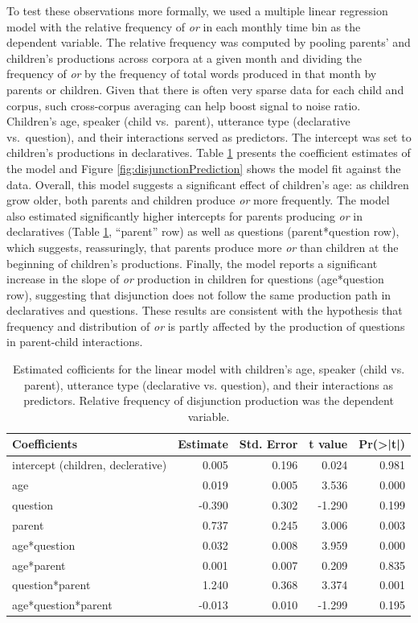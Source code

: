 \documentclass[
  english,
  ,man,floatsintext]{apa6}
\begin{document}
To test these observations more formally, we used a multiple linear regression model with the relative frequency of \emph{or} in each monthly time bin as the dependent variable. The relative frequency was computed by pooling parents' and children's productions across corpora at a given month and dividing the frequency of \emph{or} by the frequency of total words produced in that month by parents or children. Given that there is often very sparse data for each child and corpus, such cross-corpus averaging can help boost signal to noise ratio. Children's age, speaker (child vs.~parent), utterance type (declarative vs.~question), and their interactions served as predictors. The intercept was set to children's productions in declaratives. Table \ref{tab:study1coeftable} presents the coefficient estimates of the model and Figure \ref{fig:disjunctionPrediction} shows the model fit against the data. Overall, this model suggests a significant effect of children's age: as children grow older, both parents and children produce \emph{or} more frequently. The model also estimated significantly higher intercepts for parents producing \emph{or} in declaratives (Table \ref{tab:study1coeftable}, ``parent'' row) as well as questions (parent*question row), which suggests, reassuringly, that parents produce more \emph{or} than children at the beginning of children's productions. Finally, the model reports a significant increase in the slope of \emph{or} production in children for questions (age*question row), suggesting that disjunction does not follow the same production path in declaratives and questions. These results are consistent with the hypothesis that frequency and distribution of \emph{or} is partly affected by the production of questions in parent-child interactions.

\begin{table}

\caption{\label{tab:study1coeftable}Estimated cofficients for the linear model with children's age, speaker (child vs. parent), utterance type (declarative vs. question), and their interactions as predictors. Relative frequency of disjunction production was the dependent variable.}
\centering
\fontsize{9}{11}\selectfont
\begin{tabular}[t]{l|r|r|r|r}
\hline
Coefficients & Estimate & Std. Error & t value & Pr(>|t|)\\
\hline
intercept (children, declerative) & 0.005 & 0.196 & 0.024 & 0.981\\
\hline
age & 0.019 & 0.005 & 3.536 & 0.000\\
\hline
question & -0.390 & 0.302 & -1.290 & 0.199\\
\hline
parent & 0.737 & 0.245 & 3.006 & 0.003\\
\hline
age*question & 0.032 & 0.008 & 3.959 & 0.000\\
\hline
age*parent & 0.001 & 0.007 & 0.209 & 0.835\\
\hline
question*parent & 1.240 & 0.368 & 3.374 & 0.001\\
\hline
age*question*parent & -0.013 & 0.010 & -1.299 & 0.195\\
\hline
\end{tabular}
\end{table}
\end{document}
